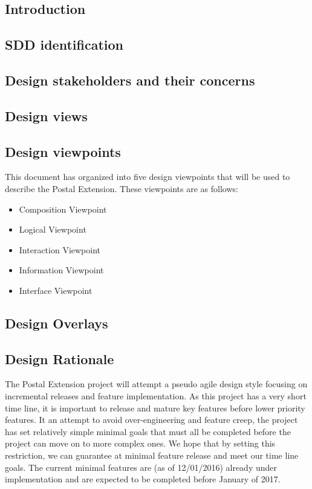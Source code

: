 \documentclass[letterpaper,10pt,titlepage,draftclsnofoot,onecolumn,onesided] {IEEEtran}
\begin{document}
\subsection{Introduction}

\subsection{SDD identification}

\subsection{Design stakeholders and their concerns}

\subsection{Design views}

\subsection{Design viewpoints}
This document has organized into five design viewpoints that will be used to describe the Postal Extension.
These viewpoints are as follows:
\begin {itemize}
\item Composition Viewpoint
\item Logical Viewpoint
\item Interaction Viewpoint
\item Information Viewpoint
\item Interface Viewpoint
\end {itemize}

\subsection{Design Overlays}

\subsection{Design Rationale}
The Postal Extension project will attempt a pseudo agile design style focusing on incremental releases and feature implementation.
As this project has a very short time line, it is important to release and mature key features before lower priority features. 
It an attempt to avoid over-engineering and feature creep, the project has set relatively simple minimal goals that must all be completed before the project can move on to more complex ones.
We hope that by setting this restriction, we can guarantee at minimal feature release and meet our time line goals.
The current minimal features are (as of 12/01/2016) already under implementation and are expected to be completed before January of 2017.
\end{document}
